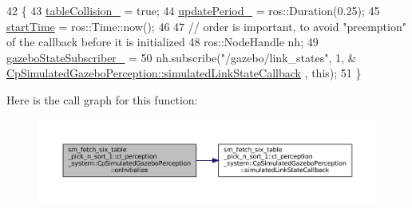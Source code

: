 \begin{DoxyCode}
42             \{                
43                 \hyperlink{classsm__fetch__six__table__pick__n__sort__1_1_1cl__perception__system_1_1CpSimulatedGazeboPerception_a64fe9f7f3b8c9369bab68737872f0929}{tableCollision\_} = \textcolor{keyword}{true};
44                 \hyperlink{classsm__fetch__six__table__pick__n__sort__1_1_1cl__perception__system_1_1CpSimulatedGazeboPerception_a8d98066880a91100a36380bc1401539f}{updatePeriod\_} = ros::Duration(0.25);
45                 \hyperlink{classsm__fetch__six__table__pick__n__sort__1_1_1cl__perception__system_1_1CpSimulatedGazeboPerception_a79d2d2f58266aa29422dd239940c71fe}{startTime} = ros::Time::now();
46                 
47                 \textcolor{comment}{// order is important, to avoid "preemption" of the callback before it is initialized}
48                 ros::NodeHandle nh;
49                 \hyperlink{classsm__fetch__six__table__pick__n__sort__1_1_1cl__perception__system_1_1CpSimulatedGazeboPerception_a7d54eb0de3f74e1433aacdc98b4c6ea3}{gazeboStateSubscriber\_} =
50                     nh.subscribe(\textcolor{stringliteral}{"/gazebo/link\_states"}, 1, &
      \hyperlink{classsm__fetch__six__table__pick__n__sort__1_1_1cl__perception__system_1_1CpSimulatedGazeboPerception_a8423ebb530a05ca9fc660a3d77676dbb}{CpSimulatedGazeboPerception::simulatedLinkStateCallback}
      , \textcolor{keyword}{this});
51             \}
\end{DoxyCode}
Here is the call graph for this function\+:
\nopagebreak
\begin{figure}[H]
\begin{center}
\leavevmode
\includegraphics[width=350pt]{classsm__fetch__six__table__pick__n__sort__1_1_1cl__perception__system_1_1CpSimulatedGazeboPerception_a59ebcf12c7fe1f7933ae4d741bc8aaea_cgraph}
\end{center}
\end{figure}
\mbox{\label{classsm__fetch__six__table__pick__n__sort__1_1_1cl__perception__system_1_1CpSimulatedGazeboPerception_a40276b12f8e7993a30428cea7cf3a302}} 
